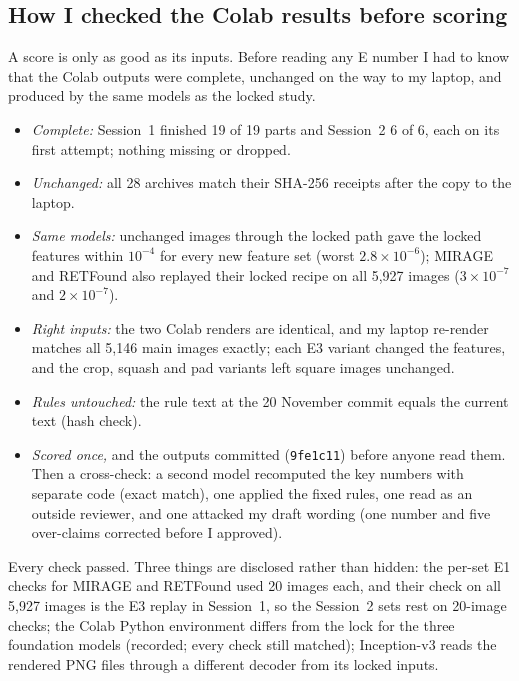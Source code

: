 \documentclass[10pt,a4paper]{article}
\newcommand{\hash}[1]{\texttt{\footnotesize #1}}
\newenvironment{parts}{\begin{description}[style=unboxed, leftmargin=0pt, itemsep=3pt, font=\normalfont\bfseries\itshape]}{\end{description}}
\newenvironment{topic}[2]{\subsection{#1}\label{#2}\begin{parts}}{\end{parts}}
\begin{document}
\begin{topic}{How I checked the Colab results before scoring}{sec:p1checks}
\item[The problem.] A score is only as good as its inputs. Before reading any E number I had to know that the
Colab outputs were complete, unchanged on the way to my laptop, and produced by the same models as the locked study.
\item[What I did.] \mbox{}
\begin{itemize}
  \item \emph{Complete:} Session~1 finished 19 of 19 parts and Session~2 6 of 6, each on its first attempt;
        nothing missing or dropped.
  \item \emph{Unchanged:} all 28 archives match their SHA-256 receipts after the copy to the laptop.
  \item \emph{Same models:} unchanged images through the locked path gave the locked features within $10^{-4}$
        for every new feature set (worst $2.8\times10^{-6}$); MIRAGE and RETFound also replayed their locked
        recipe on all 5,927 images ($3\times10^{-7}$ and $2\times10^{-7}$).
  \item \emph{Right inputs:} the two Colab renders are identical, and my laptop re-render matches all 5,146 main
        images exactly; each E3 variant changed the features, and the crop, squash and pad variants left square
        images unchanged.
  \item \emph{Rules untouched:} the rule text at the 20 November commit equals the current text (hash check).
  \item \emph{Scored once,} and the outputs committed (\hash{9fe1c11}) before anyone read them. Then a
        cross-check: a second model recomputed the key numbers with separate code (exact match), one applied the
        fixed rules, one read as an outside reviewer, and one attacked my draft wording (one number and five
        over-claims corrected before I approved).
\end{itemize}
\item[Result.] Every check passed. Three things are disclosed rather than hidden: the per-set E1 checks for MIRAGE
and RETFound used 20 images each, and their check on all 5,927 images is the E3 replay in Session~1, so the
Session~2 sets rest on 20-image checks; the Colab Python environment differs
from the lock for the three foundation models (recorded; every check still matched); Inception-v3 reads the
rendered PNG files through a different decoder from its locked inputs.
\end{topic}
\end{document}

